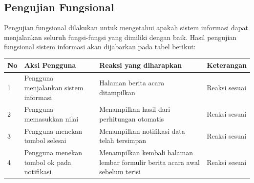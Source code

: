 	\subsection{Pengujian Fungsional}
	\label{sub: PFungsional}
	Pengujian fungsional dilakukan untuk mengetahui apakah sistem informasi dapat menjalankan seluruh fungsi-fungsi yang dimiliki dengan baik. Hasil pengujian fungsional sistem informasi akan dijabarkan pada tabel berikut:\\
	\begin{tabular}{| m{0.75cm} | m{7cm} | m{5cm} | m{3cm} |}
		\hline
		No & Aksi Pengguna & Reaksi yang diharapkan & Keterangan \\
		\hline
		1 & Pengguna menjalankan sistem informasi & Halaman berita acara ditampilkan & Reaksi sesuai \\
		\hline
		2 & Pengguna memasukkan nilai & Menampilkan hasil dari perhitungan otomatis & Reaksi sesuai \\
		\hline
		3 & Pengguna menekan tombol selesai & Menampilkan notifikasi data telah tersimpan & Reaksi sesuai \\
		\hline
		4 & Pengguna menekan tombol ok pada notifikasi & Menampilkan kembali halaman lembar formulir berita acara awal sebelum terisi & Reaksi sesuai \\
		\hline
	\end{tabular}